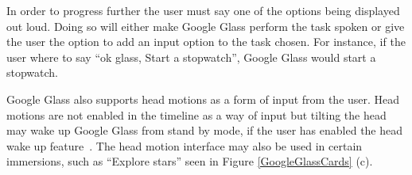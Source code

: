 In order to progress further the user must say one of the options being displayed out loud. Doing so will either make Google Glass perform the task spoken or give the user the option to add an input option to the task chosen. For instance, if the user where to say ``ok glass, Start a stopwatch'', Google Glass would start a stopwatch.

Google Glass also supports head motions as a form of input from the user. Head motions are not enabled in the timeline as a way of input but tilting the head may wake up Google Glass from stand by mode, if the user has enabled the head wake up feature~\cite{headWakeUp}. The head motion interface may also be used in certain immersions, such as ``Explore stars'' seen in Figure \ref{GoogleGlassCards} (c).




